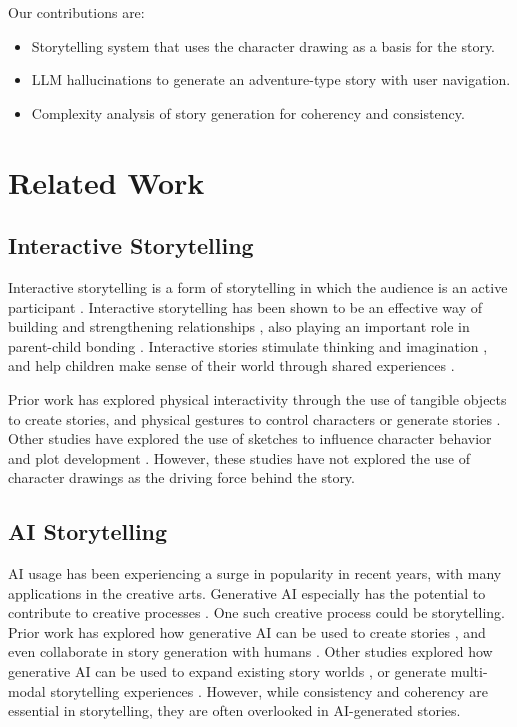 \documentclass[submit,techrep,english]{ipsj}
\begin{document}
Our contributions are:
\begin{itemize}
    \item Storytelling system that uses the character drawing as a basis for the story.
    \item LLM hallucinations to generate an adventure-type story with user navigation.
    \item Complexity analysis of story generation for coherency and consistency.
\end{itemize}


\section{Related Work}
\label{sec:related-work}

\subsection{Interactive Storytelling}
Interactive storytelling is a form of storytelling in which the audience is an active participant \cite{14:WangRCRMB22}. Interactive storytelling has been shown to be an effective way of building and strengthening relationships \cite{15:SchlauchSG22}, also playing an important role in parent-child bonding \cite{12:ZhangXWYRWYWL22}. Interactive stories stimulate thinking and imagination \cite{11:LimaGV20}, and help children make sense of their world through shared experiences \cite{9:RyokaiC99}.

Prior work has explored physical interactivity through the use of tangible objects \cite{9:RyokaiC99} to create stories, and physical gestures to control characters \cite{2:LiuLWCS12} or generate stories \cite{3:ZhaoB23}. Other studies have explored the use of sketches to influence character behavior and plot development \cite{11:LimaGV20}. However, these studies have not explored the use of character drawings as the driving force behind the story.

\subsection{AI Storytelling}
AI usage has been experiencing a surge in popularity in recent years, with many applications in the creative arts. Generative AI especially has the potential to contribute to creative processes \cite{6:TholanderJ23}. One such creative process could be storytelling. Prior work has explored how generative AI can be used to create stories \cite{13:abs-2011-04242}, and even collaborate in story generation with humans \cite{8:ShakeriND21}. Other studies explored how generative AI can be used to expand existing story worlds \cite{10:ChopraVSS21}, or generate multi-modal storytelling experiences \cite{4:HanC23}. However, while consistency and coherency are essential in storytelling, they are often overlooked in AI-generated stories.
\end{document}
